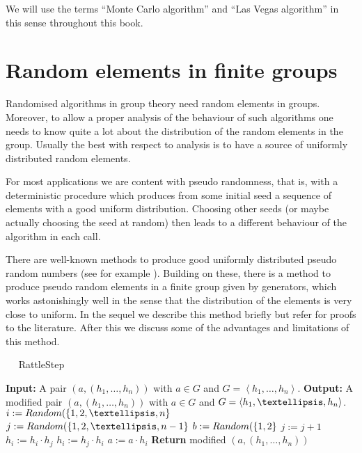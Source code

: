 We will use the terms ``Monte Carlo algorithm'' and ``Las Vegas
algorithm'' in this sense throughout this book.

\section{Random elements in finite groups}
\label{randomelts}

Randomised algorithms in group theory need random elements in groups.
Moreover, to allow a proper analysis of the behaviour of such
algorithms one needs to know quite a lot about the distribution of
the random elements in the group. Usually the best with respect to
analysis is to have a source of uniformly distributed random elements.

For most applications we are content with pseudo randomness, that is, with a
deterministic procedure which produces from some initial seed a sequence of 
elements with a good uniform distribution. Choosing other seeds (or
maybe actually choosing the seed at random) then leads to a different
behaviour of the algorithm in each call.

There are well-known methods to produce good uniformly distributed
pseudo random numbers (see for example \cite[Chapter~3]{AOCP2}).
Building on these, there is a method to produce pseudo random elements
in a finite group given by generators, which works astonishingly
well in the sense that the distribution of the elements is very close
to uniform. In the sequel we describe this method briefly but refer
for proofs to the literature. After this we discuss some of the
advantages and limitations of this method.

\begin{algorithm}
\caption{$\quad$ \sc RattleStep}
\label{rattlestep}
\begin{algorithmic}
\STATE \textbf{Input:} A pair $(a,(h_1, \ldots, h_n))$ with $a \in G$
and $G = \left< h_1, \ldots, h_n \right>$.
\STATE \textbf{Output:} A modified pair $(a,(h_1, \ldots, h_n))$ with $a \in G$
and $G = \left< \smash{h_1, \ldots, h_n} \right>$.
\vspace*{2mm}
\STATE $i := \textsc{Random}(\{ 1,2,\ldots,n\}$
\STATE $j := \textsc{Random}(\{1,2,\ldots,n-1\}$
\STATE $b := \textsc{Random}(\{1,2\}$
    \STATE $j := j + 1$
\ENDIF
{}
    \STATE $h_i := h_i \cdot h_j$
\ELSE
    \STATE $h_i := h_j \cdot h_i$
\ENDIF
\STATE $a := a \cdot h_i$
\STATE \textbf{Return} modified $(a,(h_1,\ldots,h_n))$
\end{algorithmic}
\end{algorithm}

